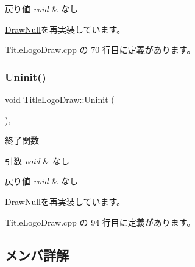 \begin{DoxyRetVals}{戻り値}
{\em void} & なし \\
\hline
\end{DoxyRetVals}


\mbox{\hyperlink{class_draw_null_a20aef1e54c1a158b741bfd731e18efdf}{Draw\+Null}}を再実装しています。



 Title\+Logo\+Draw.\+cpp の 70 行目に定義があります。

\mbox{\label{class_title_logo_draw_a07bbf9e8de5c7b9ee028408496c13c50}} 
\subsubsection{\texorpdfstring{Uninit()}{Uninit()}}
{\footnotesize\ttfamily void Title\+Logo\+Draw\+::\+Uninit (\begin{DoxyParamCaption}{ }\end{DoxyParamCaption})\hspace{0.3cm}{\ttfamily [override]}, {\ttfamily [virtual]}}



終了関数 


\begin{DoxyParams}{引数}
{\em void} & なし \\
\hline
\end{DoxyParams}

\begin{DoxyRetVals}{戻り値}
{\em void} & なし \\
\hline
\end{DoxyRetVals}


\mbox{\hyperlink{class_draw_null_a6e81d63efab7333e8d0e8af99362a4d9}{Draw\+Null}}を再実装しています。



 Title\+Logo\+Draw.\+cpp の 94 行目に定義があります。



\subsection{メンバ詳解}
\mbox{\label{class_title_logo_draw_aa5a69465f7847bae2e449b9d8ac71479}} 
